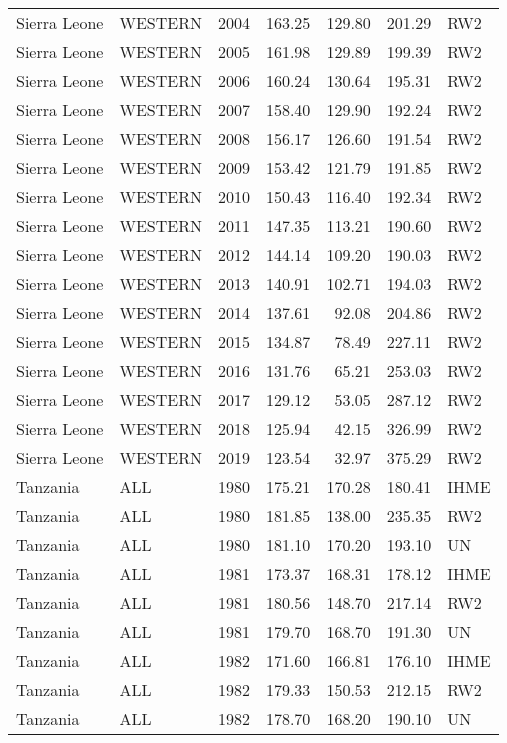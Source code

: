 \begin{longtable}{lllrrrl}
  Sierra Leone & WESTERN & 2004 & 163.25 & 129.80 & 201.29 & RW2 \\ 
  Sierra Leone & WESTERN & 2005 & 161.98 & 129.89 & 199.39 & RW2 \\ 
  Sierra Leone & WESTERN & 2006 & 160.24 & 130.64 & 195.31 & RW2 \\ 
  Sierra Leone & WESTERN & 2007 & 158.40 & 129.90 & 192.24 & RW2 \\ 
  Sierra Leone & WESTERN & 2008 & 156.17 & 126.60 & 191.54 & RW2 \\ 
  Sierra Leone & WESTERN & 2009 & 153.42 & 121.79 & 191.85 & RW2 \\ 
  Sierra Leone & WESTERN & 2010 & 150.43 & 116.40 & 192.34 & RW2 \\ 
  Sierra Leone & WESTERN & 2011 & 147.35 & 113.21 & 190.60 & RW2 \\ 
  Sierra Leone & WESTERN & 2012 & 144.14 & 109.20 & 190.03 & RW2 \\ 
  Sierra Leone & WESTERN & 2013 & 140.91 & 102.71 & 194.03 & RW2 \\ 
  Sierra Leone & WESTERN & 2014 & 137.61 & 92.08 & 204.86 & RW2 \\ 
  Sierra Leone & WESTERN & 2015 & 134.87 & 78.49 & 227.11 & RW2 \\ 
  Sierra Leone & WESTERN & 2016 & 131.76 & 65.21 & 253.03 & RW2 \\ 
  Sierra Leone & WESTERN & 2017 & 129.12 & 53.05 & 287.12 & RW2 \\ 
  Sierra Leone & WESTERN & 2018 & 125.94 & 42.15 & 326.99 & RW2 \\ 
  Sierra Leone & WESTERN & 2019 & 123.54 & 32.97 & 375.29 & RW2 \\ 
  Tanzania & ALL & 1980 & 175.21 & 170.28 & 180.41 & IHME \\ 
  Tanzania & ALL & 1980 & 181.85 & 138.00 & 235.35 & RW2 \\ 
  Tanzania & ALL & 1980 & 181.10 & 170.20 & 193.10 & UN \\ 
  Tanzania & ALL & 1981 & 173.37 & 168.31 & 178.12 & IHME \\ 
  Tanzania & ALL & 1981 & 180.56 & 148.70 & 217.14 & RW2 \\ 
  Tanzania & ALL & 1981 & 179.70 & 168.70 & 191.30 & UN \\ 
  Tanzania & ALL & 1982 & 171.60 & 166.81 & 176.10 & IHME \\ 
  Tanzania & ALL & 1982 & 179.33 & 150.53 & 212.15 & RW2 \\ 
  Tanzania & ALL & 1982 & 178.70 & 168.20 & 190.10 & UN \\ 

\end{longtable}
